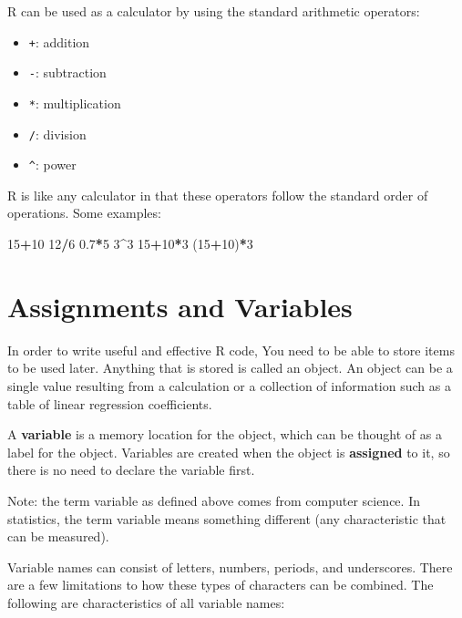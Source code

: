 \documentclass[
]{book}
\newenvironment{Shaded}{\begin{snugshade}}{\end{snugshade}}
\newcommand{\DecValTok}[1]{\textcolor[rgb]{0.00,0.00,0.81}{#1}}
\newcommand{\FloatTok}[1]{\textcolor[rgb]{0.00,0.00,0.81}{#1}}
\newcommand{\NormalTok}[1]{#1}
\newcommand{\SpecialCharTok}[1]{\textcolor[rgb]{0.81,0.36,0.00}{\textbf{#1}}}
\providecommand{\tightlist}{%
  \setlength{\itemsep}{0pt}\setlength{\parskip}{0pt}}
\theoremstyle{definition}
\theoremstyle{definition}
\theoremstyle{definition}
\theoremstyle{definition}
\theoremstyle{remark}
\begin{document}
R can be used as a calculator by using the standard arithmetic operators:

\begin{itemize}
\tightlist
\item
  \texttt{+}: addition
\item
  \texttt{-}: subtraction
\item
  \texttt{*}: multiplication
\item
  \texttt{/}: division
\item
  \texttt{\^{}}: power
\end{itemize}

R is like any calculator in that these operators follow the standard order of operations. Some examples:

\begin{Shaded}
\begin{Highlighting}[]
\DecValTok{15}\SpecialCharTok{+}\DecValTok{10}
\DecValTok{12}\SpecialCharTok{/}\DecValTok{6}
\FloatTok{0.7}\SpecialCharTok{*}\DecValTok{5}
\DecValTok{3}\SpecialCharTok{\^{}}\DecValTok{3}
\DecValTok{15}\SpecialCharTok{+}\DecValTok{10}\SpecialCharTok{*}\DecValTok{3}
\NormalTok{(}\DecValTok{15}\SpecialCharTok{+}\DecValTok{10}\NormalTok{)}\SpecialCharTok{*}\DecValTok{3}
\end{Highlighting}
\end{Shaded}

\hypertarget{variables}{%
\section{Assignments and Variables}\label{variables}}

In order to write useful and effective R code, You need to be able to store items to be used later. Anything that is stored is called an object. An object can be a single value resulting from a calculation or a collection of information such as a table of linear regression coefficients.

A \textbf{variable} is a memory location for the object, which can be thought of as a label for the object. Variables are created when the object is \textbf{assigned} to it, so there is no need to declare the variable first.

Note: the term variable as defined above comes from computer science. In statistics, the term variable means something different (any characteristic that can be measured).

Variable names can consist of letters, numbers, periods, and underscores. There are a few limitations to how these types of characters can be combined. The following are characteristics of all variable names:
\end{document}
